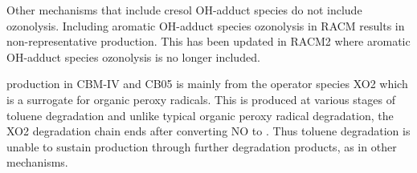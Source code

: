 Other mechanisms that include cresol OH-adduct species do not include ozonolysis.
Including aromatic OH-adduct species ozonolysis in RACM results in non-representative  production. 
This has been updated in RACM2 where aromatic OH-adduct species ozonolysis is no longer included.

 production in CBM-IV and CB05 is mainly from the operator species XO2 which is a surrogate for organic peroxy radicals.
This is produced at various stages of toluene degradation and unlike typical organic peroxy radical degradation, the XO2 degradation chain ends after converting NO to .
Thus toluene degradation is unable to sustain  production through further degradation products, as in other mechanisms.
